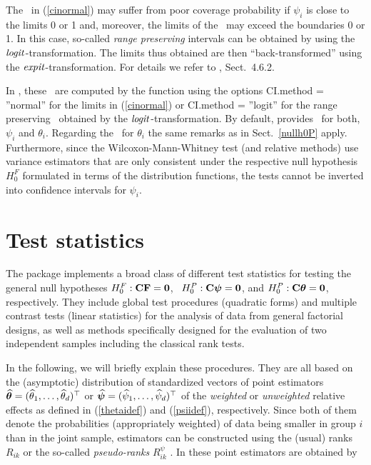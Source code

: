 The \cis\ in (\ref{cinormal}) may suffer from poor coverage probability if $\psi_i$ 
is close to the limits 0 or 1 and, moreover, the limits of the \ci\ may exceed 
the boundaries 0 or 1. In this case, so-called {\it range preserving} intervals 
can be obtained by using the $\logit$-transformation. The limits thus obtained 
are then ``back-transformed'' using the $\expit$-transformation. For details we 
refer to \cite{brunner2019rank}, Sect.~4.6.2.

In , these \cis\ are computed by the 
function  using the options CI.method = ''normal'' for the limits in 
(\ref{cinormal}) or CI.method = ''logit'' for the range preserving \cis\ 
obtained by the $\logit$-transformation. By default,  provides \cis\ for 
both, $\psi_i$ and $\theta_i$. Regarding the \cis\ for $\theta_i$ the 
same remarks as in Sect.~\ref{nullh0P} apply. Furthermore, since 
the Wilcoxon-Mann-Whitney test (and relative methods) use variance estimators that are only consistent under the
respective null hypothesis $H_0^F$ formulated in terms of the distribution functions, the tests cannot be inverted into confidence intervals for $\psi_i$.



\section{Test statistics}\label{teststat}


The  package implements a broad class of different test statistics 
for testing the general null hypotheses $H_0^F: \mathbf{C} \mathbf{F} = \mathbf{0}$, \ $H_0^P: 
\mathbf{C} \boldsymbol{\psi} = \mathbf{0}$, and $H_0^P: \mathbf{C} \boldsymbol{\theta} = \mathbf{0}$, respectively. 
They include global test procedures (quadratic forms) and multiple contrast 
tests (linear statistics) for the analysis of data from general factorial 
designs, as well as methods specifically designed for the evaluation of two 
independent samples including the classical rank tests. 

In the following, we will briefly explain these procedures. They are all based 
on the (asymptotic) distribution of standardized vectors of point estimators 
$\boldsymbol{\widehat{\theta}} = (\widehat{\theta}_1, \ldots, \widehat{\theta}_d)^\top$ or $\boldsymbol{\widehat{\psi}} =(\widehat{\psi}_1, 
\ldots, \widehat{\psi}_d)^\top$ of the \textit{weighted}  or \textit{unweighted} 
relative effects as defined in (\ref{thetaidef}) and (\ref{psiidef}), 
respectively. Since both of them denote the probabilities (appropriately 
weighted) of data being smaller in group $i$ than in the joint sample, 
estimators can be constructed using the (usual) ranks $R_{ik}$ or the so-called 
\textit{pseudo-ranks} $R_{ik}^\psi$ \citep{happ2020pseudo}. 
In  these point estimators are obtained by 

